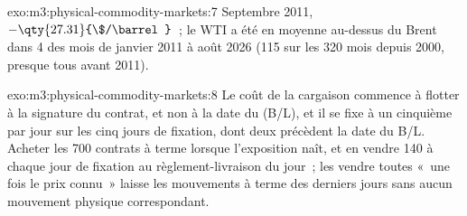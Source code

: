 \begin{solution}{exo:m3:physical-commodity-markets:7}
Septembre 2011, $-\qty{27.31}{\$/\barrel}$~; le WTI a été en moyenne au-dessus du Brent dans 4 des
mois de janvier 2011 à août 2026 (115 sur les 320 mois depuis 2000, presque tous
avant 2011).
\end{solution}

\begin{solution}{exo:m3:physical-commodity-markets:8}
Le coût de la cargaison commence à flotter à la signature du contrat, et non à la date du  (B/L),
et il se fixe à un cinquième par jour sur les cinq jours de fixation, dont deux précèdent
la date du B/L. Acheter les 700 contrats à terme lorsque l'exposition naît, et en vendre 140 à chaque
jour de fixation au règlement-livraison du jour~; les vendre toutes «~une fois le prix connu~»
laisse les mouvements à terme des derniers jours sans aucun mouvement physique correspondant.
\end{solution}

